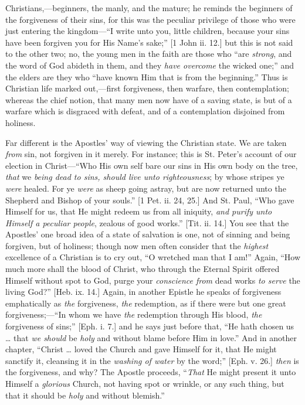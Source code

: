 Christians,—beginners, the manly, and the mature; he reminds the
beginners of the forgiveness of their sins, for this was the peculiar
privilege of those who were just entering the kingdom—``I write
unto you, little children, because your sins have been forgiven you
for His Name's sake;'' [1 John ii. 12.] but this is not said to
the other two; no, the young men in the faith are those who ``are \emph{strong},
and the word of God abideth in them, and they \emph{have overcome} the
wicked one;'' and the elders are they who ``have known Him
that is from the beginning.'' Thus is Christian life marked out,—first
forgiveness, then warfare, then contemplation; whereas the chief
notion, that many men now have of a saving state, is but of a warfare
which is disgraced with defeat, and of a contemplation disjoined from
holiness.

Far different is the Apostles' way of viewing the Christian state.
We are taken \emph{from} sin, not forgiven in it merely. For instance;
this is St. Peter's account of our election in Christ—``Who His
own self bare our sins in His own body on the tree, \emph{that} we \emph{being
dead to sins, should live unto righteousness}; by whose stripes ye \emph{were}
healed. For ye \emph{were} as sheep going astray, but are now returned
unto the Shepherd and Bishop of your souls.'' [1 Pet. ii. 24, 25.]
And St. Paul, ``Who gave Himself for us, that He might redeem us
from all iniquity, \emph{and purify unto Himself a peculiar people},
zealous of good works.'' [Tit. ii. 14.] You see that the Apostles'
one broad idea of a state of salvation is one, not of sinning and
being forgiven, but of holiness; though now men often consider that
the \emph{highest} excellence of a Christian is to cry out, ``O
wretched man that I am!'' Again, ``How much more shall the
blood of Christ, who through the Eternal Spirit offered Himself
without spot to God, purge your \emph{conscience from} dead works \emph{to
serve} the living God?'' [Heb. ix. 14.] Again, in another
Epistle he speaks of forgiveness emphatically as \emph{the}
forgiveness, \emph{the} redemption, as if there were but one great
forgiveness;—``In whom we have \emph{the} redemption through His
blood, \emph{the} forgiveness of sins;'' [Eph. i. 7.] and he says
just before that, ``He hath chosen us … that \emph{we should} be
\emph{holy}
and without blame before Him in love.'' And in another chapter,
``Christ … loved the Church and gave Himself for it, that He
might sanctify it, cleansing it in the \emph{washing of water} by the
word;'' [Eph. v. 26.] \emph{then} is the forgiveness, and why? The
Apostle proceeds, ``\emph{That} He might present it unto Himself a
\emph{glorious} Church, not having spot or wrinkle, or any such thing,
but that it should be \emph{holy} and without blemish.''

